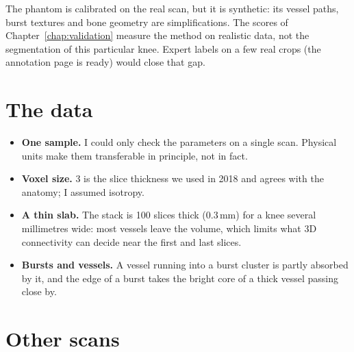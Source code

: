The phantom is calibrated on the real scan, but it is synthetic: its vessel paths, burst textures and
bone geometry are simplifications. The scores of Chapter~\ref{chap:validation} measure the method on
realistic data, not the segmentation of this particular knee. Expert labels on a few real crops (the
annotation page is ready) would close that gap.

\section{The data}

\begin{itemize}
  \item \textbf{One sample.} I could only check the parameters on a single scan. Physical units make them
        transferable in principle, not in fact.
  \item \textbf{Voxel size.} 3\um{} is the slice thickness we used in 2018 and agrees with the
        anatomy; I assumed isotropy.
  \item \textbf{A thin slab.} The stack is 100 slices thick (0.3\,mm) for a knee several millimetres
        wide: most vessels leave the volume, which limits what 3D connectivity can decide near the
        first and last slices.
  \item \textbf{Bursts and vessels.} A vessel running into a burst cluster is partly absorbed by it,
        and the edge of a burst takes the bright core of a thick vessel passing close by.
\end{itemize}

\section{Other scans}

